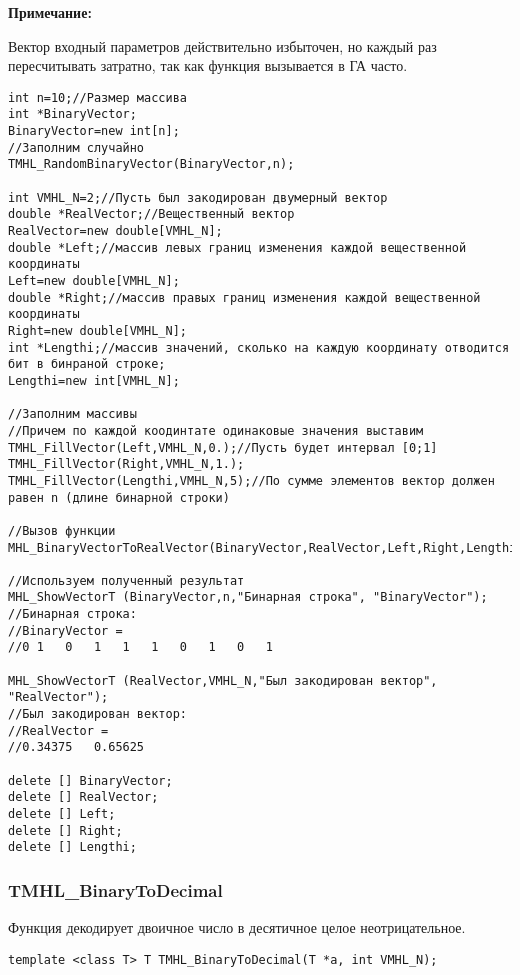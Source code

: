 \documentclass[a4paper,12pt]{article}
\begin{document}
\textbf{Примечание:}

 Вектор входный параметров действительно избыточен, но каждый раз пересчитывать затратно, так как функция вызывается в ГА часто.


\begin{lstlisting}[label=code_use_MHL_BinaryVectorToRealVector,caption=Пример использования]
int n=10;//Размер массива
int *BinaryVector;
BinaryVector=new int[n];
//Заполним случайно
TMHL_RandomBinaryVector(BinaryVector,n);

int VMHL_N=2;//Пусть был закодирован двумерный вектор
double *RealVector;//Вещественный вектор
RealVector=new double[VMHL_N];
double *Left;//массив левых границ изменения каждой вещественной координаты
Left=new double[VMHL_N];
double *Right;//массив правых границ изменения каждой вещественной координаты
Right=new double[VMHL_N];
int *Lengthi;//массив значений, сколько на каждую координату отводится бит в бинраной строке;
Lengthi=new int[VMHL_N];

//Заполним массивы
//Причем по каждой коодинтате одинаковые значения выставим
TMHL_FillVector(Left,VMHL_N,0.);//Пусть будет интервал [0;1]
TMHL_FillVector(Right,VMHL_N,1.);
TMHL_FillVector(Lengthi,VMHL_N,5);//По сумме элементов вектор должен равен n (длине бинарной строки)

//Вызов функции
MHL_BinaryVectorToRealVector(BinaryVector,RealVector,Left,Right,Lengthi,VMHL_N);

//Используем полученный результат
MHL_ShowVectorT (BinaryVector,n,"Бинарная строка", "BinaryVector");
//Бинарная строка:
//BinaryVector =	
//0	1	0	1	1	1	0	1	0	1

MHL_ShowVectorT (RealVector,VMHL_N,"Был закодирован вектор", "RealVector");
//Был закодирован вектор:
//RealVector =	
//0.34375	0.65625

delete [] BinaryVector;
delete [] RealVector;
delete [] Left;
delete [] Right;
delete [] Lengthi;
\end{lstlisting}

\subsubsection{TMHL\_BinaryToDecimal}\label{TMHL_BinaryToDecimal}

Функция декодирует двоичное число в десятичное целое неотрицательное.


\begin{lstlisting}[label=code_syntax_TMHL_BinaryToDecimal,caption=Синтаксис]
template <class T> T TMHL_BinaryToDecimal(T *a, int VMHL_N);
\end{lstlisting}
\end{document}
